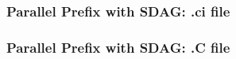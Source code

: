 \begin{frame}[allowframebreaks]
  \frametitle{Parallel Prefix with SDAG: .ci file}
  
\end{frame}

\begin{frame}[allowframebreaks]
  \frametitle{Parallel Prefix with SDAG: .C file}
  
\end{frame}
